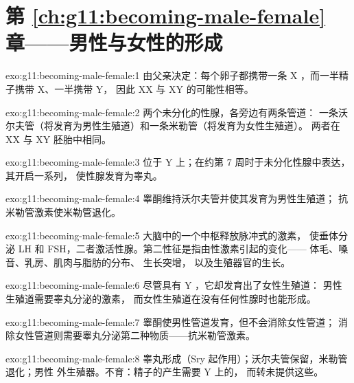 \section*{第 \ref{ch:g11:becoming-male-female} 章——男性与女性的形成}

\begin{solution}{exo:g11:becoming-male-female:1}
由父亲决定：每个卵子都携带一条 X ，而一半精子携带 X、一半携带 Y，
因此 XX 与 XY 的可能性相等。
\end{solution}

\begin{solution}{exo:g11:becoming-male-female:2}
两个未分化的性腺，各旁边有两条管道：
一条沃尔夫管（将发育为男性生殖道）和一条米勒管（将发育为女性生殖道）。
两者在 XX 与 XY 胚胎中相同。
\end{solution}

\begin{solution}{exo:g11:becoming-male-female:3}
位于 Y 上；在约第 7 周时于未分化性腺中表达，
其开启一系列，
使性腺发育为睾丸。
\end{solution}

\begin{solution}{exo:g11:becoming-male-female:4}
睾酮维持沃尔夫管并使其发育为男性生殖道；
抗米勒管激素使米勒管退化。
\end{solution}

\begin{solution}{exo:g11:becoming-male-female:5}
大脑中的一个中枢释放脉冲式的激素，
使垂体分泌 LH 和 FSH，二者激活性腺。第二性征是指由性激素引起的变化——
体毛、嗓音、乳房、肌肉与脂肪的分布、
生长突增，
以及生殖器官的生长。
\end{solution}

\begin{solution}{exo:g11:becoming-male-female:6}
尽管具有 Y ，它却发育出了女性生殖道：
男性生殖道需要睾丸分泌的激素，
而女性生殖道在没有任何性腺时也能形成。
\end{solution}

\begin{solution}{exo:g11:becoming-male-female:7}
睾酮使男性管道发育，但不会消除女性管道；
消除女性管道则需要睾丸分泌第二种物质——抗米勒管激素。
\end{solution}

\begin{solution}{exo:g11:becoming-male-female:8}
睾丸形成（Sry 起作用）；沃尔夫管保留，米勒管退化；男性
外生殖器。不育：精子的产生需要 Y 上的，
而转未提供这些。
\end{solution}

